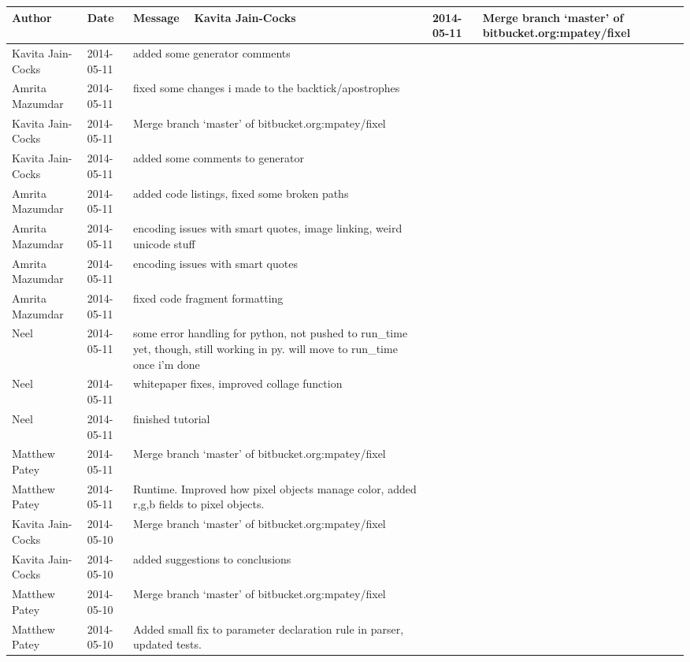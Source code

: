 \begin{center}
\begin{longtabu} to \textwidth {|
    X[4,l]|
    X[3,c]|
    X[8,l]|}
    \hline
    \textbf{Author} & \textbf{Date} & \textbf{Message} \ \hline
Kavita Jain-Cocks & 2014-05-11 & Merge branch `master' of bitbucket.org:mpatey/fixel \\ \hline
Kavita Jain-Cocks & 2014-05-11 & added some generator comments \\ \hline
Amrita Mazumdar & 2014-05-11 & fixed some changes i made to the backtick/apostrophes \\ \hline
Kavita Jain-Cocks & 2014-05-11 & Merge branch `master' of bitbucket.org:mpatey/fixel \\ \hline
Kavita Jain-Cocks & 2014-05-11 & added some comments to generator \\ \hline
Amrita Mazumdar & 2014-05-11 & added code listings, fixed some broken paths \\ \hline
Amrita Mazumdar & 2014-05-11 & encoding issues with smart quotes, image linking, weird unicode stuff \\ \hline
Amrita Mazumdar & 2014-05-11 & encoding issues with smart quotes \\ \hline
Amrita Mazumdar & 2014-05-11 & fixed code fragment formatting \\ \hline
Neel & 2014-05-11 & some error handling for python, not pushed to run\_time yet, though, still working in py. will move to run\_time once i'm done \\ \hline
Neel & 2014-05-11 & whitepaper fixes, improved collage function \\ \hline
Neel & 2014-05-11 & finished tutorial \\ \hline
Matthew Patey & 2014-05-11 & Merge branch `master' of bitbucket.org:mpatey/fixel \\ \hline
Matthew Patey & 2014-05-11 & Runtime. Improved how pixel objects manage color, added r,g,b fields to pixel objects. \\ \hline
Kavita Jain-Cocks & 2014-05-10 & Merge branch `master' of bitbucket.org:mpatey/fixel \\ \hline
Kavita Jain-Cocks & 2014-05-10 & added suggestions to conclusions \\ \hline
Matthew Patey & 2014-05-10 & Merge branch `master' of bitbucket.org:mpatey/fixel \\ \hline
Matthew Patey & 2014-05-10 & Added small fix to parameter declaration rule in parser, updated tests. \\ \hline

\end{longtabu}
\end{center}
